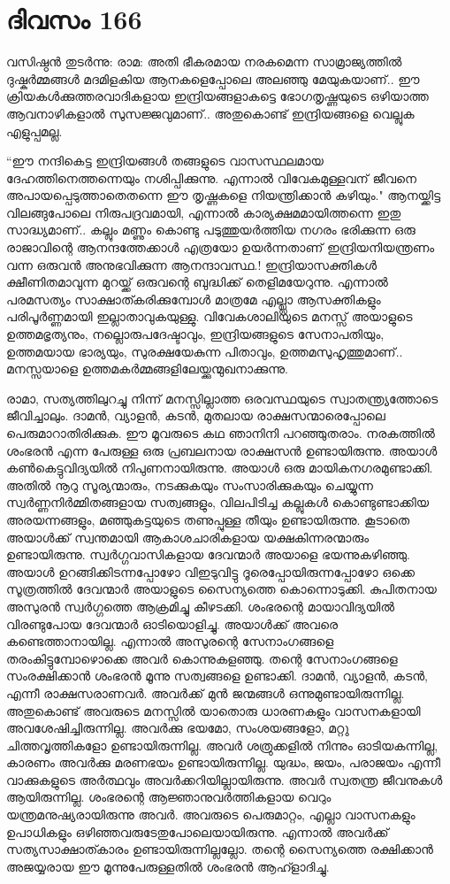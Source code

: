 \section{ദിവസം 166}


വസിഷ്ഠൻ തുടർന്നു: രാമ: അതി ഭീകരമായ നരകമെന്ന സാമ്രാജ്യത്തിൽ ദുഷ്കര്‍മ്മങ്ങള്‍ മദമിളകിയ ആനകളെപ്പോലെ അലഞ്ഞു മേയുകയാണ്‌.. ഈ ക്രിയകൾക്കുത്തരവാദികളായ ഇന്ദ്രിയങ്ങളാകട്ടെ ഭോഗതൃഷ്ണയുടെ ഒഴിയാത്ത ആവനാഴികളാൽ സുസജ്ജവുമാണ്‌.. അതുകൊണ്ട് ഇന്ദ്രിയങ്ങളെ വെല്ലുക എളുപ്പമല്ല.

“ഈ നന്ദികെട്ട ഇന്ദ്രിയങ്ങൾ തങ്ങളുടെ വാസസ്ഥലമായ ദേഹത്തിനെത്തന്നെയും നശിപ്പിക്കുന്നു. എന്നാൽ വിവേകമുള്ളവന്‌ ജീവനെ അപായപ്പെടുത്താതെതന്നെ ഈ തൃഷ്ണകളെ നിയന്ത്രിക്കാൻ കഴിയും." ആനയ്ക്കിട്ട വിലങ്ങുപോലെ നിരുപദ്രവമായി, എന്നാൽ കാര്യക്ഷമമായിത്തന്നെ ഇതു സാദ്ധ്യമാണ്‌.. കല്ലും മണ്ണും കൊണ്ടു പടുത്തുയർത്തിയ നഗരം ഭരിക്കുന്ന ഒരു രാജാവിന്റെ ആനന്ദത്തേക്കാൾ എത്രയോ ഉയർന്നതാണ്‌ ഇന്ദ്രിയനിയന്ത്രണം വന്ന ഒരുവൻ അനുഭവിക്കുന്ന ആനന്ദാവസ്ഥ.! ഇന്ദ്രിയാസക്തികൾ ക്ഷീണിതമാവുന്ന മുറയ്ക്ക് ഒരുവന്റെ ബുദ്ധിക്ക് തെളിമയേറുന്നു. എന്നാൽ പരമസത്യം സാക്ഷാത്കരിക്കുമ്പോൾ മാത്രമേ എല്ല്ലാ ആസക്തികളും പരിപൂർണ്ണമായി ഇല്ലാതാവുകയുള്ളു. വിവേകശാലിയുടെ മനസ്സ് അയാളുടെ ഉത്തമഭൃത്യനും, നല്ലൊരുപദേഷ്ടാവും, ഇന്ദ്രിയങ്ങളുടെ സേനാപതിയും, ഉത്തമയായ ഭാര്യയും, സുരക്ഷയേകുന്ന പിതാവും, ഉത്തമസുഹൃത്തുമാണ്‌.. മനസ്സയാളെ ഉത്തമകർമ്മങ്ങളിലേയ്ക്കുന്മുഖനാക്കുന്നു.

രാമാ, സത്യത്തിലുറച്ചു നിന്ന് മനസ്സില്ലാത്ത ഒരവസ്ഥയുടെ സ്വാതന്ത്ര്യത്തോടെ ജീവിച്ചാലും. ദാമന്‍, വ്യാളന്‍, കടന്‍,  മുതലായ രാക്ഷസന്മാരെപ്പോലെ പെരുമാറാതിരിക്കുക. ഈ മൂവരുടെ കഥ ഞാനിനി പറഞ്ഞുതരാം. നരകത്തിൽ ശംഭരൻ എന്ന പേരുള്ള ഒരു പ്രബലനായ രാക്ഷസൻ ഉണ്ടായിരുന്നു. അയാൾ കൺകെട്ടുവിദ്യയിൽ നിപുണനായിരുന്നു. അയാള്‍ ഒരു മായികനഗരമുണ്ടാക്കി. അതിൽ നൂറു സൂര്യന്മാരും, നടക്കുകയും സംസാരിക്കുകയും ചെയ്യുന്ന സ്വർണ്ണനിർമ്മിതങ്ങളായ സത്വങ്ങളും, വിലപിടിച്ച കല്ലുകൾ കൊണ്ടുണ്ടാക്കിയ അരയന്നങ്ങളും, മഞ്ഞുകട്ടയുടെ തണുപ്പുള്ള തീയും ഉണ്ടായിരുന്നു. കൂടാതെ അയാൾക്ക് സ്വന്തമായി ആകാശചാരികളായ യക്ഷകിന്നരന്മാരും ഉണ്ടായിരുന്നു. സ്വർഗ്ഗവാസികളായ ദേവന്മാർ അയാളെ ഭയന്നുകഴിഞ്ഞു. അയാൾ ഉറങ്ങിക്കിടന്നപ്പോഴോ വിഇടുവിട്ടു ദൂരെപ്പോയിരുന്നപ്പോഴോ ഒക്കെ സൂത്രത്തിൽ ദേവന്മാർ അയാളുടെ സൈന്യത്തെ കൊന്നൊടുക്കി. കുപിതനായ അസുരൻ സ്വർഗ്ഗത്തെ ആക്രമിച്ചു കീഴടക്കി. ശംഭരന്റെ മായാവിദ്യയിൽ വിരണ്ടുപോയ ദേവന്മാർ ഓടിയൊളിച്ചു. അയാൾക്ക് അവരെ കണ്ടെത്താനായില്ല. എന്നാൽ അസുരന്റെ സേനാംഗങ്ങളെ തരംകിട്ടുമ്പോഴൊക്കെ അവർ കൊന്നുകളഞ്ഞു. തന്റെ സേനാംഗങ്ങളെ സംരക്ഷിക്കാൻ ശംഭരൻ മൂന്നു സത്വങ്ങളെ ഉണ്ടാക്കി. ദാമന്‍, വ്യാളന്‍, കടന്‍, എന്നീ രാക്ഷസരാണവര്‍. അവർക്ക് മുൻ ജന്മങ്ങൾ ഒന്നുമുണ്ടായിരുന്നില്ല. അതുകൊണ്ട് അവരുടെ മനസ്സിൽ യാതൊരു ധാരണകളും വാസനകളായി അവശേഷിച്ചിരുന്നില്ല. അവർക്കു ഭയമോ, സംശയങ്ങളോ, മറ്റു ചിത്തവൃത്തികളോ ഉണ്ടായിരുന്നില്ല. അവർ ശത്രുക്കളിൽ നിന്നും ഓടിയകന്നില്ല, കാരണം അവർക്കു മരണഭയം ഉണ്ടായിരുന്നില്ല. യുദ്ധം, ജയം, പരാജയം എന്നീ വാക്കുകളുടെ അർത്ഥവും അവർക്കറിയില്ലായിരുന്നു. അവർ സ്വതന്ത്ര ജീവനുകൾ ആയിരുന്നില്ല. ശംഭരന്റെ ആജ്ഞാനുവർത്തികളായ വെറും യന്ത്രമനുഷ്യരായിരുന്നു അവർ. അവരുടെ പെരുമാറ്റം, എല്ലാ വാസനകളും ഉപാധികളും ഒഴിഞ്ഞവരുടേതുപോലെയായിരുന്നു. എന്നാൽ അവർക്ക് സത്യസാക്ഷാത്കാരം ഉണ്ടായിരുന്നില്ലല്ലോ. തന്റെ സൈന്യത്തെ രക്ഷിക്കാൻ അജയ്യരായ ഈ മൂന്നുപേരുള്ളതിൽ ശംഭരൻ ആഹ്ളാദിച്ചു. 

